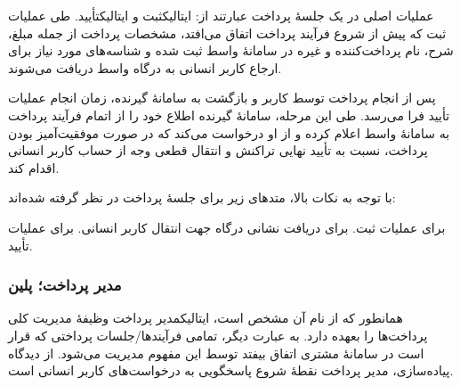 عملیات اصلی در یک جلسهٔ پرداخت عبارتند از:
‌ایتالیک{ثبت} و
‌ایتالیک{تأیید}.
طی عملیات ثبت که پیش از شروع فرآیند پرداخت
اتفاق می‌افتد، مشخصات پرداخت از جمله مبلغ،
شرح، نام پرداخت‌کننده و غیره در سامانهٔ واسط
ثبت شده و شناسه‌های مورد نیاز برای ارجاع
کاربر انسانی به درگاه واسط دریافت می‌شوند.

پس از انجام پرداخت توسط کاربر و
بازگشت به سامانهٔ گیرنده، زمان انجام
عملیات تأیید فرا می‌رسد. طی این مرحله، سامانهٔ
گیرنده اطلاع خود را از اتمام فرآیند پرداخت
به سامانهٔ واسط اعلام کرده و از او درخواست می‌کند
که در صورت موفقیت‌آمیز بودن پرداخت، نسبت به
تأیید نهایی تراکنش و انتقال قطعی وجه از حساب
کاربر انسانی اقدام کند.

با توجه به نکات بالا، متدهای زیر برای جلسهٔ پرداخت
در نظر گرفته شده‌اند:
\begin{itemize}
	  برای عملیات ثبت.
	  برای دریافت نشانی
	درگاه جهت انتقال کاربر انسانی.
	  برای عملیات تأیید.
\end{itemize}

\subsubsection{مدیر پرداخت؛ ‌پلین{}}
همانطور که از نام آن مشخص است،
‌ایتالیک{مدیر پرداخت} وظیفهٔ مدیریت کلی
پرداخت‌ها را بعهده دارد. به عبارت دیگر، تمامی
فرآیندها/جلسات پرداختی که قرار است در سامانهٔ
مشتری اتفاق بیفتد توسط این مفهوم مدیریت می‌شود.
از دیدگاه پیاده‌سازی، مدیر پرداخت نقطهٔ شروع
پاسخگویی به درخواست‌های کاربر انسانی است.